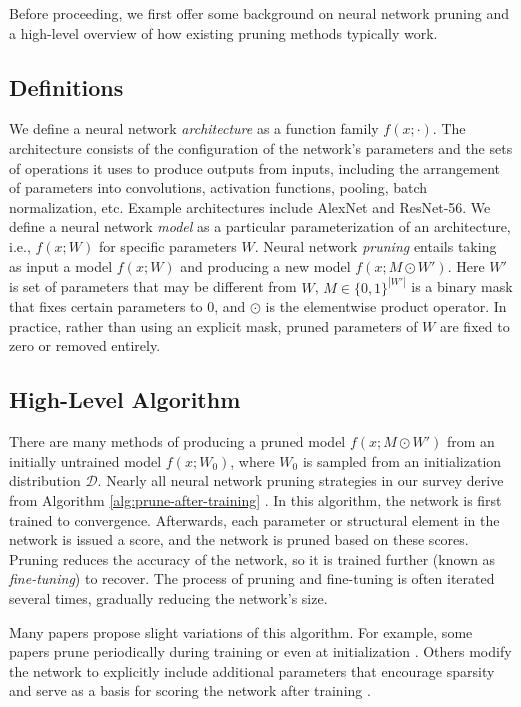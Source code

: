 \renewcommand{\algorithmicrequire}{\textbf{Input:}}
\label{sec:overview}
Before proceeding, we first offer some background on neural network pruning and a high-level overview of how existing pruning methods typically work.

\subsection{Definitions}

We define a neural network \emph{architecture} as a function family $f(x; \cdot)$.
The architecture consists of the configuration of the network's parameters and the sets of operations it uses to produce outputs from inputs, including the arrangement of parameters into convolutions, activation functions, pooling, batch normalization, etc.
Example architectures include AlexNet and ResNet-56.
We define a neural network \emph{model} as a particular parameterization of an architecture, i.e., $f(x; W)$ for specific parameters $W$.
Neural network \emph{pruning} entails taking as input a model $f(x; W)$ and producing a new model $f(x; M \odot W')$. Here $W'$ is set of parameters that may be different from $W$, $M \in \{0, 1\}^{|W'|}$ is a binary mask that fixes certain parameters to $0$, and $\odot$ is the elementwise product operator.
In practice, rather than using an explicit mask, pruned parameters of $W$ are fixed to zero or removed entirely.

\subsection{High-Level Algorithm}

There are many methods of producing a pruned model $f(x; M \odot W')$ from an initially untrained model $f(x; W_0)$, where $W_0$ is sampled from an initialization distribution $\mathcal{D}$.
Nearly all neural network pruning strategies in our survey derive from Algorithm \ref{alg:prune-after-training} \cite{learning-both}.
In this algorithm, the network is first trained to convergence.
Afterwards, each parameter or structural element in the network is issued a score, and the network is pruned based on these scores.
Pruning reduces the accuracy of the network, so it is trained further (known as \emph{fine-tuning}) to recover.
The process of pruning and fine-tuning is often iterated several times, gradually reducing the network's size.

Many papers propose slight variations of this algorithm.
For example, some papers prune periodically during training \cite{google-state-of-sparsity} or even at initialization \cite{snip}.
Others modify the network to explicitly include additional parameters that encourage sparsity and serve as a basis for scoring the network after training \cite{sparse-variational-dropout}.

